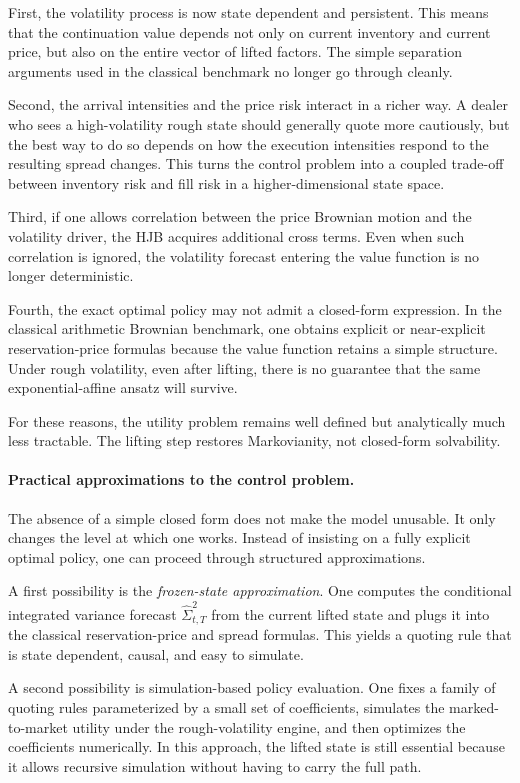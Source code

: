 \documentclass[a4paper,10pt,titlepage,oneside,openany]{book}
\theoremstyle{plain}
\theoremstyle{definition}
\theoremstyle{remark}
\newcommand{\1}{\mathbf{1}}
\begin{document}
First, the volatility process is now state dependent and persistent. This means that the continuation value depends not only on current inventory and current price, but also on the entire vector of lifted factors. The simple separation arguments used in the classical benchmark no longer go through cleanly.

Second, the arrival intensities and the price risk interact in a richer way. A dealer who sees a high-volatility rough state should generally quote more cautiously, but the best way to do so depends on how the execution intensities respond to the resulting spread changes. This turns the control problem into a coupled trade-off between inventory risk and fill risk in a higher-dimensional state space.

Third, if one allows correlation between the price Brownian motion and the volatility driver, the HJB acquires additional cross terms. Even when such correlation is ignored, the volatility forecast entering the value function is no longer deterministic.

Fourth, the exact optimal policy may not admit a closed-form expression. In the classical arithmetic Brownian benchmark, one obtains explicit or near-explicit reservation-price formulas because the value function retains a simple structure. Under rough volatility, even after lifting, there is no guarantee that the same exponential-affine ansatz will survive.

For these reasons, the utility problem remains well defined but analytically much less tractable. The lifting step restores Markovianity, not closed-form solvability.

\paragraph{Practical approximations to the control problem.}

The absence of a simple closed form does not make the model unusable. It only changes the level at which one works. Instead of insisting on a fully explicit optimal policy, one can proceed through structured approximations.

A first possibility is the \emph{frozen-state approximation}. One computes the conditional integrated variance forecast \(\widehat{\Sigma}_{t,T}^2\) from the current lifted state and plugs it into the classical reservation-price and spread formulas. This yields a quoting rule that is state dependent, causal, and easy to simulate.

A second possibility is simulation-based policy evaluation. One fixes a family of quoting rules parameterized by a small set of coefficients, simulates the marked-to-market utility under the rough-volatility engine, and then optimizes the coefficients numerically. In this approach, the lifted state is still essential because it allows recursive simulation without having to carry the full path.
\end{document}
